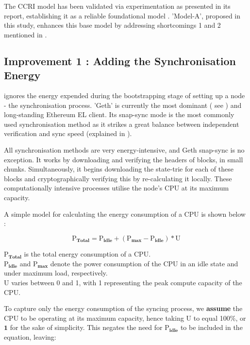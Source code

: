 The CCRI model has been validated via experimentation as presented in its report, establishing it as a reliable foundational model \cite{CryptoCarbonRatingsInstitute2022TheNetwork}. 'Model-A', proposed in this study, enhances this base model by addressing shortcomings 1 and 2 mentioned in .

\subsection{Improvement 1 : Adding the Synchronisation Energy} 

  ignores the energy expended during the bootstrapping stage of setting up a node - the synchronisation process. 'Geth' is currently the most dominant ( see ) and long-standing Ethereum EL client. Its snap-sync mode is the most commonly used synchronisation method as it strikes a great balance between independent verification and sync speed (explained in ).

 All synchronisation methods are very energy-intensive, and Geth snap-sync is no exception. It works by downloading and verifying the headers of blocks, in small chunks. Simultaneously, it begins downloading the state-trie for each of these blocks and cryptographically verifying this by re-calculating it locally. These computationally intensive processes utilise the node's CPU at its maximum capacity.

A simple model for calculating the energy consumption of a CPU is shown below \cite{PelleyUnderstandingPower} :

\begin{equation*}
    \boldsymbol{\mathrm{P}_{Total} = \mathrm{P}_{idle} + \left({\mathrm{P}_{max} - \mathrm{P}_{idle}}\right) * \mathrm{U}}
\end{equation*}

$\boldsymbol{\mathrm{P}_{Total}}$ is the total energy consumption of a CPU.\\
$\boldsymbol{\mathrm{P}_{idle}}$ and $\boldsymbol{\mathrm{P}_{max}}$ denote the power consumption of the CPU in an idle state and under maximum load, respectively.\\
$\boldsymbol{\mathrm{U}}$ varies between 0 and 1, with 1 representing the peak compute capacity of the CPU.

To capture only the energy consumption of the syncing process, we \textbf{assume} the CPU to be operating at its maximum capacity, hence taking $\boldsymbol{\mathrm{U}}$ to equal 100\%, or $\boldsymbol{1}$ for the sake of simplicity. This negates the need for $\boldsymbol{\mathrm{P}_{idle}}$ to be included in the equation, leaving:

